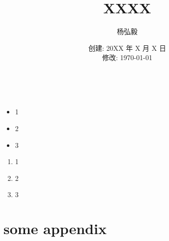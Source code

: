 \documentclass[11pt]{article}
\title{XXXX}
\author{杨弘毅}
\date{创建: 20XX 年 X 月 X 日 \\修改: \today}
\begin{document}
\maketitle

\section{}

\subsection{}

\subsubsection{}

\begin{equation*}
\end{equation*}

\begin{align*}
\end{align*}

\begin{itemize}[leftmargin=0em]
	\item 1
	\item 2
	\item 3
\end{itemize}

\begin{enumerate}
	\item 1
	\item 2
	\item 3
\end{enumerate}

\begin{figure}[ht!]
	\centering
	\caption{}
\end{figure}



\appendix
\section{some appendix}
\end{document}
